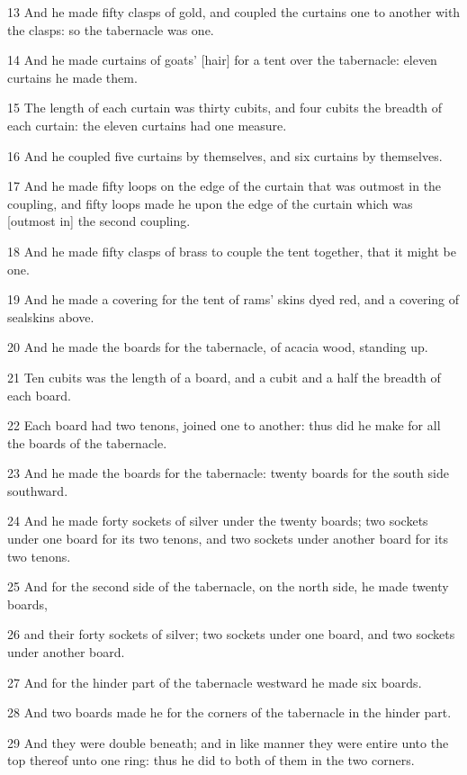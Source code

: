 \par 13 And he made fifty clasps of gold, and coupled the curtains one to another with the clasps: so the tabernacle was one.
\par 14 And he made curtains of goats' [hair] for a tent over the tabernacle: eleven curtains he made them.
\par 15 The length of each curtain was thirty cubits, and four cubits the breadth of each curtain: the eleven curtains had one measure.
\par 16 And he coupled five curtains by themselves, and six curtains by themselves.
\par 17 And he made fifty loops on the edge of the curtain that was outmost in the coupling, and fifty loops made he upon the edge of the curtain which was [outmost in] the second coupling.
\par 18 And he made fifty clasps of brass to couple the tent together, that it might be one.
\par 19 And he made a covering for the tent of rams' skins dyed red, and a covering of sealskins above.
\par 20 And he made the boards for the tabernacle, of acacia wood, standing up.
\par 21 Ten cubits was the length of a board, and a cubit and a half the breadth of each board.
\par 22 Each board had two tenons, joined one to another: thus did he make for all the boards of the tabernacle.
\par 23 And he made the boards for the tabernacle: twenty boards for the south side southward.
\par 24 And he made forty sockets of silver under the twenty boards; two sockets under one board for its two tenons, and two sockets under another board for its two tenons.
\par 25 And for the second side of the tabernacle, on the north side, he made twenty boards,
\par 26 and their forty sockets of silver; two sockets under one board, and two sockets under another board.
\par 27 And for the hinder part of the tabernacle westward he made six boards.
\par 28 And two boards made he for the corners of the tabernacle in the hinder part.
\par 29 And they were double beneath; and in like manner they were entire unto the top thereof unto one ring: thus he did to both of them in the two corners.
